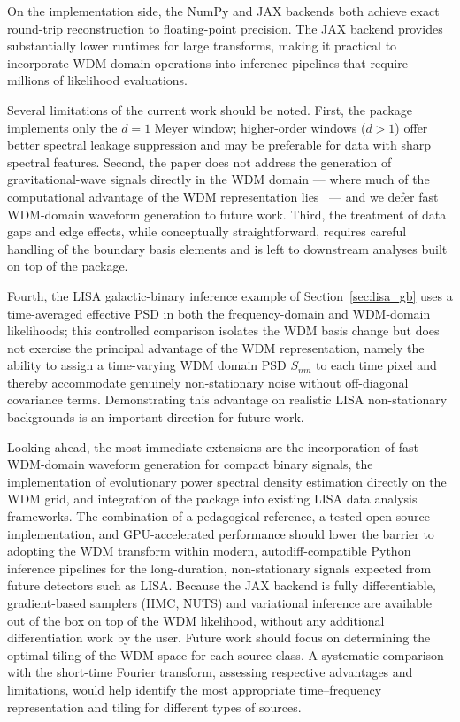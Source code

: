\documentclass[twocolumn,preprintnumbers,
  superscriptaddress,
  nofootinbib,
  amsmath,
  amssymb,
  aps,
  prd,
  colorlinks=true,
  linkcolor=blue,
  urlcolor=blue,
  citecolor=blue,
  anchorcolor=blue
]{revtex4-2}
\begin{document}
On the implementation side, the NumPy and JAX backends both achieve exact round-trip reconstruction to floating-point precision. The JAX backend provides substantially lower runtimes for large transforms, making it practical to incorporate WDM-domain operations into inference pipelines that require millions of likelihood evaluations.

Several limitations of the current work should be noted. First, the package implements only the $d=1$ Meyer window; higher-order windows ($d > 1$) offer better spectral leakage suppression and may be preferable for data with sharp spectral features.
Second, the paper does not address the generation of gravitational-wave signals directly in the WDM domain — where much of the computational advantage of the WDM representation lies~\cite{Cornish:2020odn} — and we defer fast WDM-domain waveform generation to future work. Third, the treatment of data gaps and edge effects, while conceptually straightforward, requires careful handling of the boundary basis elements and is left to downstream analyses built on top of the package.%

Fourth, the LISA galactic-binary inference example of Section~\ref{sec:lisa_gb} uses a time-averaged effective PSD in both the frequency-domain and WDM-domain likelihoods; this controlled comparison isolates the WDM basis change but does not exercise the principal advantage of the WDM representation, namely the ability to assign a time-varying WDM domain PSD $S_{nm}$ to each time pixel and thereby accommodate genuinely non-stationary noise without off-diagonal covariance terms.
Demonstrating this advantage on realistic LISA non-stationary backgrounds is an important direction for
future work.

Looking ahead, the most immediate extensions are the incorporation of fast WDM-domain waveform generation for compact binary signals, the implementation of evolutionary power spectral density estimation directly on the WDM grid, and integration of the package into existing LISA data analysis frameworks.  The combination of a pedagogical reference, a tested open-source implementation, and GPU-accelerated performance should lower the barrier to adopting the WDM transform within modern, autodiff-compatible Python inference pipelines for the long-duration, non-stationary signals expected from future detectors such as LISA.
Because the JAX backend is fully differentiable, gradient-based samplers (HMC, NUTS) and variational inference are available out of the box on top of the WDM likelihood, without any additional differentiation work by the user. Future work should focus on determining the optimal tiling of the WDM space for each source class. A systematic comparison with the short-time Fourier transform, assessing respective advantages and limitations, would help identify the most appropriate time–frequency representation and tiling for different types of sources. 
\end{document}
